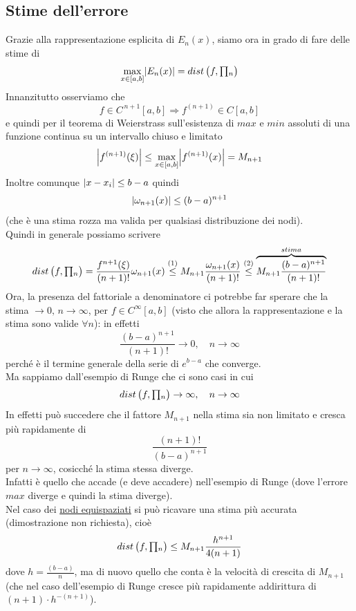 \subsection{Stime dell'errore}
Grazie alla rappresentazione esplicita di $E_n(x)$, siamo ora in grado di fare delle stime di
\[\max_{x \in [a,b]} \abs{E_n(x)} = dist\left(f, \inter_n\right)\]
Innanzitutto osserviamo che
\[f \in C^{\,n+1}[a,b] \Longrightarrow f^{(n+1)} \in C[a,b]\]
e quindi per il teorema di Weierstrass sull'esistenza di $max$ e $min$ assoluti di una funzione continua su un intervallo chiuso e limitato
\begin{equation}
    \abs*{f^{(n+1)}(\xi)} \le \max_{x \in [a,b]} \abs*{f^{(n+1)}(x)} = M_{n+1}
\end{equation}
Inoltre comunque $\abs{x-x_i} \le b-a$ quindi
\begin{equation}
    \abs*{\omega_{n+1}(x)} \le (b-a)^{n+1}
\end{equation}
(che è una stima rozza ma valida per qualsiasi distribuzione dei nodi).\\
Quindi in generale possiamo scrivere
\[dist\left(f,\inter_n \right)= \dfrac{f^{n+1}(\xi)}{(n+1)!} \omega_{n+1}(x) 
\overset{(1)}{\leq} M_{n+1} \dfrac{\omega_{n+1}(x)}{(n+1)!} \overset{(2)}{\leq} \overbrace{M_{n+1} \frac{(b-a)^{n+1}}{(n+1)!}}^{stima}\]
Ora, la presenza del fattoriale a denominatore ci potrebbe far sperare che la stima $\to 0,\, n \to \infty$, per $f \in C^{\infty}[a,b]$ (visto che allora la rappresentazione e la stima sono valide $\forall n$): in effetti
\[\frac{(b-a)^{n+1}}{(n+1)!} \to 0, \quad n \to \infty\]
perché è il termine generale della serie di $e^{b-a}$ che converge.\\
Ma sappiamo dall'esempio di Runge che ci sono casi in cui
\[dist\left(f,\inter_n \right) \to \infty, \quad n \to \infty\]
In effetti può succedere che il fattore $M_{n+1}$ nella stima sia non limitato e cresca più rapidamente di 
\[ \frac{(n+1)!}{(b-a)^{n+1}} \]
per $n \to \infty$, cosicché la stima stessa diverge.\\
Infatti è quello che accade (e deve accadere) nell'esempio di Runge (dove l'errore $max$ diverge e quindi la stima diverge).\\
Nel caso dei \uline{nodi equispaziati} si può ricavare una stima più accurata (dimostrazione non richiesta), cioè
\[dist\left(f,\inter_n \right) \le M_{n+1} \frac{h^{n+1}}{4(n+1)}\]
dove $h = \frac{(b-a)}{n}$, ma di nuovo quello che conta è la velocità di crescita di $M_{n+1}$ (che nel caso dell'esempio di Runge cresce più rapidamente addirittura di $(n+1) \cdot h^{-(n+1)}$).\\
